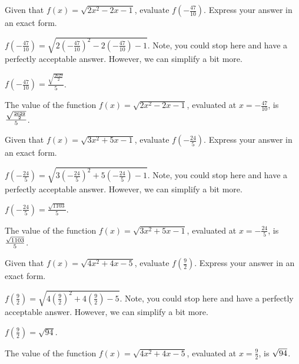 \begin{shuffle}
\begin{exercise}
Given that $f(x)=\sqrt{2 x^2-2 x-1}$, evaluate $f\left(-\frac{47}{10}\right)$. Express your answer in an exact form.
\begin{solution}
\begin{hint}
$f\left(-\frac{47}{10}\right)=\sqrt{2 (-\frac{47}{10})^2-2 (-\frac{47}{10})-1}$. Note, you could stop here and have a perfectly acceptable answer. However, we can simplify a bit more. 
\end{hint}
\begin{hint}
$f\left(-\frac{47}{10}\right)=\frac{\sqrt{\frac{2629}{2}}}{5}$.
\end{hint}
The value of the function $f(x) = \sqrt{2 x^2-2 x-1}$, evaluated at $x=-\frac{47}{10}$, is ${\frac{\sqrt{\frac{2629}{2}}}{5}}$.
\end{solution}
\end{exercise}

\begin{exercise}
Given that $f(x)=\sqrt{3 x^2+5 x-1}$, evaluate $f\left(-\frac{24}{5}\right)$. Express your answer in an exact form.
\begin{solution}
\begin{hint}
$f\left(-\frac{24}{5}\right)=\sqrt{3 (-\frac{24}{5})^2+5 (-\frac{24}{5})-1}$. Note, you could stop here and have a perfectly acceptable answer. However, we can simplify a bit more. 
\end{hint}
\begin{hint}
$f\left(-\frac{24}{5}\right)=\frac{\sqrt{1103}}{5}$.
\end{hint}
The value of the function $f(x) = \sqrt{3 x^2+5 x-1}$, evaluated at $x=-\frac{24}{5}$, is ${\frac{\sqrt{1103}}{5}}$.
\end{solution}
\end{exercise}

\begin{exercise}
Given that $f(x)=\sqrt{4 x^2+4 x-5}$, evaluate $f\left(\frac{9}{2}\right)$. Express your answer in an exact form.
\begin{solution}
\begin{hint}
$f\left(\frac{9}{2}\right)=\sqrt{4 (\frac{9}{2})^2+4 (\frac{9}{2})-5}$. Note, you could stop here and have a perfectly acceptable answer. However, we can simplify a bit more. 
\end{hint}
\begin{hint}
$f\left(\frac{9}{2}\right)=\sqrt{94}$.
\end{hint}
The value of the function $f(x) = \sqrt{4 x^2+4 x-5}$, evaluated at $x=\frac{9}{2}$, is ${\sqrt{94}}$.
\end{solution}
\end{exercise}


\end{shuffle}
